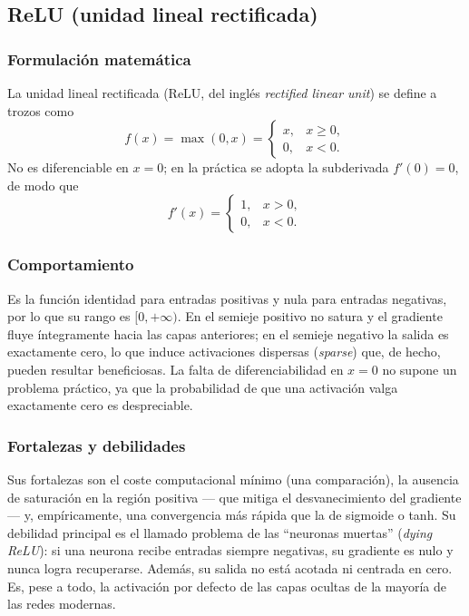 \documentclass[12pt,a4paper]{article}
\begin{document}
\subsection{ReLU (unidad lineal rectificada)}

\subsubsection{Formulación matemática}
La unidad lineal rectificada (ReLU, del inglés \emph{rectified linear unit}) se define a trozos como
\begin{equation*}
f(x) = \max(0, x) =
\begin{cases}
x, & x \geq 0,\\
0, & x < 0.
\end{cases}
\end{equation*}
No es diferenciable en $x = 0$; en la práctica se adopta la subderivada $f'(0) = 0$, de modo que
\begin{equation*}
f'(x) =
\begin{cases}
1, & x > 0,\\
0, & x < 0.
\end{cases}
\end{equation*}

\subsubsection{Comportamiento}
Es la función identidad para entradas positivas y nula para entradas negativas, por lo que su rango es $[0, +\infty)$. En el semieje positivo no satura y el gradiente fluye íntegramente hacia las capas anteriores; en el semieje negativo la salida es exactamente cero, lo que induce activaciones dispersas (\emph{sparse}) que, de hecho, pueden resultar beneficiosas. La falta de diferenciabilidad en $x = 0$ no supone un problema práctico, ya que la probabilidad de que una activación valga exactamente cero es despreciable.

\subsubsection{Fortalezas y debilidades}
Sus fortalezas son el coste computacional mínimo (una comparación), la ausencia de saturación en la región positiva --- que mitiga el desvanecimiento del gradiente --- y, empíricamente, una convergencia más rápida que la de sigmoide o tanh. Su debilidad principal es el llamado problema de las ``neuronas muertas'' (\emph{dying ReLU}): si una neurona recibe entradas siempre negativas, su gradiente es nulo y nunca logra recuperarse. Además, su salida no está acotada ni centrada en cero. Es, pese a todo, la activación por defecto de las capas ocultas de la mayoría de las redes modernas.
\end{document}
